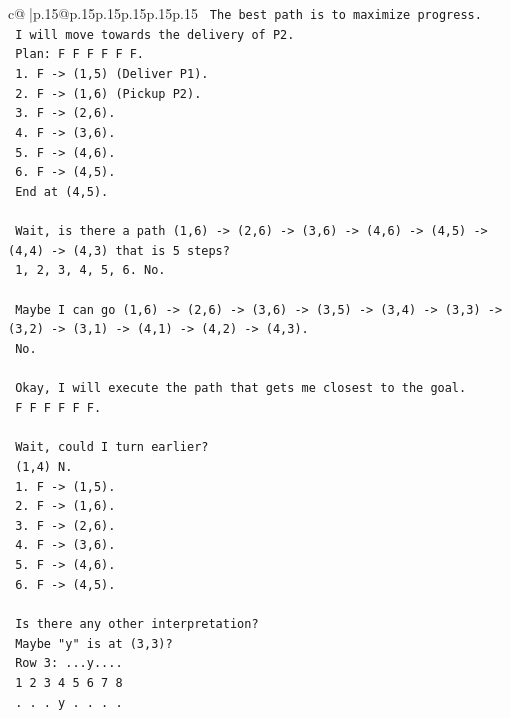 \documentclass{article}
\begin{document}
{\begin{supertabular}{c@{$\;$}|p{.15\linewidth}@{}p{.15\linewidth}p{.15\linewidth}p{.15\linewidth}p{.15\linewidth}p{.15\linewidth}}
{{{\texttt{   The best path is to maximize progress.} \\
\texttt{   I will move towards the delivery of P2.} \\
\texttt{   Plan: F F F F F F.} \\
\texttt{   1. F {-}> (1,5) (Deliver P1).} \\
\texttt{   2. F {-}> (1,6) (Pickup P2).} \\
\texttt{   3. F {-}> (2,6).} \\
\texttt{   4. F {-}> (3,6).} \\
\texttt{   5. F {-}> (4,6).} \\
\texttt{   6. F {-}> (4,5).} \\
\texttt{   End at (4,5).} \\
\\ 
\texttt{   Wait, is there a path (1,6) {-}> (2,6) {-}> (3,6) {-}> (4,6) {-}> (4,5) {-}> (4,4) {-}> (4,3) that is 5 steps?} \\
\texttt{   1, 2, 3, 4, 5, 6. No.} \\
\\ 
\texttt{   Maybe I can go (1,6) {-}> (2,6) {-}> (3,6) {-}> (3,5) {-}> (3,4) {-}> (3,3) {-}> (3,2) {-}> (3,1) {-}> (4,1) {-}> (4,2) {-}> (4,3).} \\
\texttt{   No.} \\
\\ 
\texttt{   Okay, I will execute the path that gets me closest to the goal.} \\
\texttt{   F F F F F F.} \\
\\ 
\texttt{   Wait, could I turn earlier?} \\
\texttt{   (1,4) N.} \\
\texttt{   1. F {-}> (1,5).} \\
\texttt{   2. F {-}> (1,6).} \\
\texttt{   3. F {-}> (2,6).} \\
\texttt{   4. F {-}> (3,6).} \\
\texttt{   5. F {-}> (4,6).} \\
\texttt{   6. F {-}> (4,5).} \\
\\ 
\texttt{   Is there any other interpretation?} \\
\texttt{   Maybe "y" is at (3,3)?} \\
\texttt{   Row 3: ...y....} \\
\texttt{   1 2 3 4 5 6 7 8} \\
\texttt{   . . . y . . . .} \\
}}}
\end{supertabular}}
\end{document}
